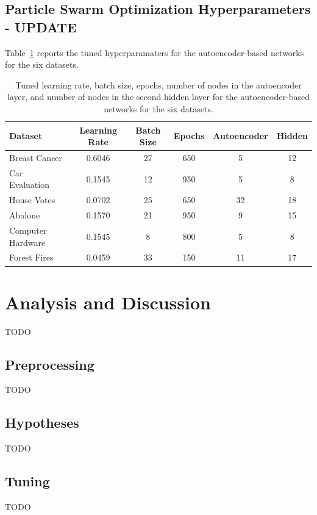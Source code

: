 \documentclass[twoside,11pt]{article}
\begin{document}
\subsection{Particle Swarm Optimization Hyperparameters - UPDATE}
Table~\ref{tab:autoencoder-tuning} reports the tuned hyperparamaters for the autoencoder-based networks for the six datasets.

\begin{table}[h]
    \centering
    \begin{tabular}{lccccc}
    \hline
    Dataset & Learning Rate & Batch Size & Epochs & Autoencoder & Hidden \\
    \hline
    Breast Cancer      & 0.6046    & 27   & 650  & 5    & 12 \\
    Car Evaluation     & 0.1545   & 12 & 950    & 5   & 8 \\
    House Votes        & 0.0702    & 25    & 650     & 32    & 18 \\
    Abalone            & 0.1570  & 21 & 950     & 9    & 15 \\
    Computer Hardware  & 0.1545   & 8  & 800   & 5     & 8 \\
    Forest Fires       & 0.0459   & 33  & 150    & 11    & 17 \\
    \hline
    \end{tabular}
    \caption{Tuned learning rate, batch size, epochs, number of nodes in the autoencoder layer, and number of nodes in the second hidden layer for the autoencoder-based networks for the six datasets.}
    \label{tab:autoencoder-tuning}
\end{table}


\section{Analysis and Discussion}
TODO

\subsection{Preprocessing}
TODO

\subsection{Hypotheses}
TODO

\subsection{Tuning}
TODO
\end{document}
